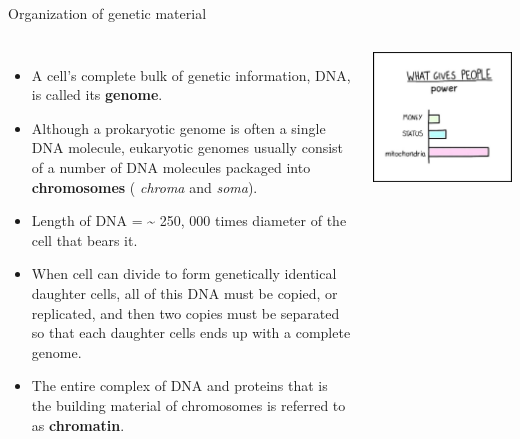 \documentclass[11pt,ignorenonframetext,aspectratio=169]{beamer}
\providecommand{\tightlist}{%
  \setlength{\itemsep}{0pt}\setlength{\parskip}{0pt}}
\newcommand{\bcolumns}{\begin{columns}[T, onlytextwidth]}
\newcommand{\ecolumns}{\end{columns}}
\begin{document}
\begin{frame}{Organization of genetic material}
\protect\hypertarget{organization-of-genetic-material}{}
\bcolumns
{}

\begin{itemize}
\tightlist
\item
  A cell's complete bulk of genetic information, DNA, is called its
  \textbf{genome}.
\item
  Although a prokaryotic genome is often a single DNA molecule,
  eukaryotic genomes usually consist of a number of DNA molecules
  packaged into \textbf{chromosomes} ( \emph{chroma} and \emph{soma}).
\item
  Length of DNA = \textasciitilde{} 250, 000 times diameter of the cell
  that bears it.
\item
  When cell can divide to form genetically identical daughter cells, all
  of this DNA must be copied, or replicated, and then two copies must be
  separated so that each daughter cells ends up with a complete genome.
\item
  The entire complex of DNA and proteins that is the building material
  of chromosomes is referred to as \textbf{chromatin}.
\end{itemize}


\begin{center}\includegraphics[width=0.8\linewidth]{../images/what_gives_power} \end{center}

\ecolumns
\end{frame}
\end{document}
